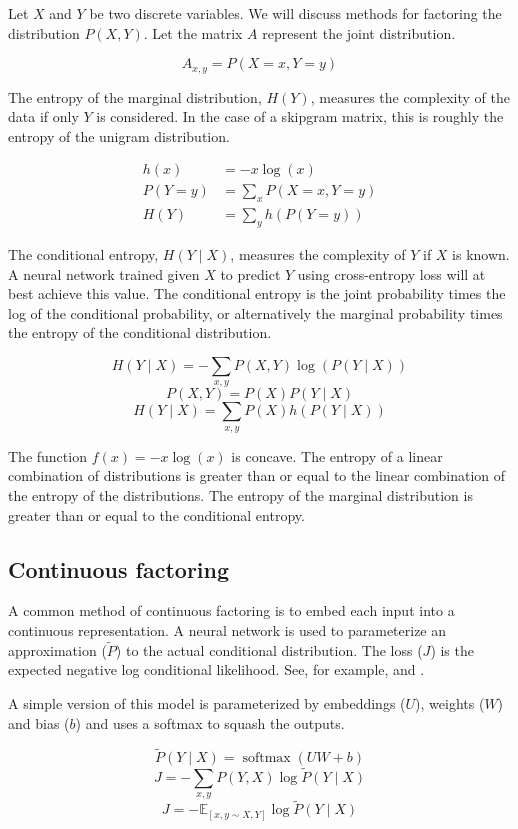 \documentclass[11pt,letterpaper]{article}
\begin{document}
Let $X$ and $Y$ be two discrete variables. We will discuss methods for factoring the distribution $P(X,Y)$. Let the matrix $A$ represent the joint distribution.

$$A_{x,y}=P(X=x, Y=y)$$

The entropy of the marginal distribution, $H(Y)$, measures the complexity of the data if only $Y$ is considered. In the case of a skipgram matrix, this is roughly the entropy of the unigram distribution.

\begin{align*}
h(x) &= -x \log(x) \\
P(Y=y) &= \sum_x P(X=x, Y=y) \\
H(Y) &=  \sum_y h(P(Y=y))
\end{align*}

The conditional entropy, $H(Y \mid X)$, measures the complexity of $Y$ if $X$ is known. A neural network trained given $X$ to predict $Y$ using cross-entropy loss will at best achieve this value. The conditional entropy is the joint probability times the log of the conditional probability, or alternatively the marginal probability times the entropy of the conditional distribution.

$$H(Y \mid X)=-\sum_{x,y} P(X, Y) \log(P(Y \mid X)) $$
$$P(X,Y) = P(X) P(Y \mid X)$$
$$H(Y \mid X)= \sum_{x,y}  P(X) h(P(Y \mid X))$$

The function $f(x)=-x \log(x)$ is concave. The entropy of a linear combination of distributions is greater than or equal to the linear combination of the entropy of the distributions. The entropy of the marginal distribution is greater than or equal to the conditional entropy.

\subsection{Continuous factoring}

A common method of continuous factoring is to embed each input into a continuous representation. A neural network is used to parameterize an approximation ($\tilde{P}$) to the actual conditional distribution. The loss ($J$) is the expected negative log conditional likelihood. See, for example, \cite{MikolovSCCD13} and \cite{Mikolov1301}. 

A simple version of this model is parameterized by embeddings ($U$), weights ($W$) and bias ($b$) and uses a softmax to squash the outputs.

$$ \tilde{P}(Y\mid X) = \operatorname{softmax}(U W+b)$$
$$ J = -\sum_{x, y} P(Y,X) \log \tilde{P}(Y \mid X) $$
$$ J = -\mathbb{E}_{[x,y \sim X, Y]} \log \tilde{P}(Y \mid X) $$
\end{document}
